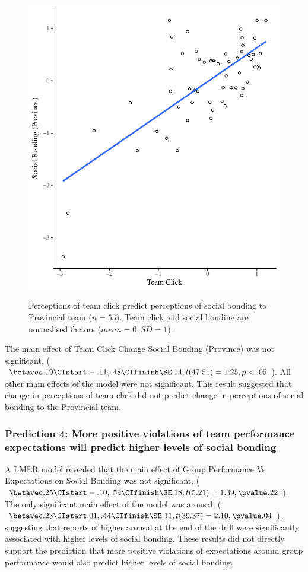 \begin{figure}
  \centering
    \includegraphics[width=0.5\linewidth,keepaspectratio] {images/groupClickTeamBondScatter}
    \label{fig:groupClickTeamBondScatter}
    \caption{Perceptions of team click predict perceptions of social bonding to Provincial team ($n = 53$).  Team click and social bonding are normalised factors ($mean = 0, SD = 1$).}
\end{figure}


The main effect of Team Click Change Social Bonding (Province) was not significant, ($\betavec .19 \CIstart -.11, .48 \CIfinish \SE .14, t(47.51) = 1.25, p < .05$).  All other main effects of the model were not significant. This result suggested that change in perceptions of team click did not predict change in perceptions of social bonding to the Provincial team.










\subsubsection{Prediction 4: More positive violations of team performance expectations will predict higher levels of social bonding}



A LMER model revealed that the main effect of Group Performance Vs Expectations on Social Bonding was not significant, ($\betavec .25 \CIstart -.10, .59 \CIfinish \SE .18, t(5.21) = 1.39, \pvalue .22$).  The only significant main effect of the model was arousal, ($\betavec .23 \CIstart .01, .44 \CIfinish \SE .11, t(39.37) = 2.10, \pvalue .04$), suggesting that reports of higher arousal at the end of the drill were significantly associated with higher levels of social bonding.  These results did not directly support the prediction that more positive violations of expectations around group performance would also predict higher levels of social bonding.

